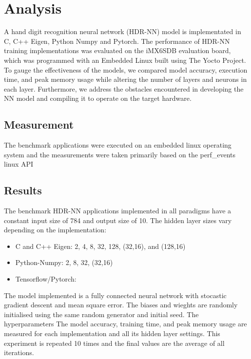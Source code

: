 \part{Analysis}
A hand digit recognition neural network (HDR-NN) model is implementated in C, C++ Eigen, Python Numpy and Pytorch. The performance of HDR-NN training implementations was evaluated on the iMX6SDB evaluation board, which was programmed with an Embedded Linux built using The Yocto Project. To gauge the effectiveness of the models, we compared model accuracy, execution time, and peak memory usage while altering the number of layers and neurons in each layer. Furthermore, we address the obstacles encountered in developing the NN model and compiling it to operate on the target hardware. 


\chapter{Measurement}

The benchmark applications were executed on an embedded linux operating system and the measurements were taken primarily based on the perf\_events linux API

\chapter{Results}
The benchmark HDR-NN applications implemented in all paradigms have a constant input size of 784 and output size of 10. The hidden layer sizes vary depending on the implementation:
\begin{itemize}
	\item C and C++ Eigen: 2, 4, 8, 32, 128, (32,16), and (128,16)
	\item Python-Numpy: 2, 8, 32, (32,16)
	\item Tensorflow/Pytorch:
\end{itemize}
The model implemented is a fully connected neural network with stocastic gradient descent and mean square error. The biases and wieghts are randomly initialised using the same random generator and initial seed. The hyperparameters   
The model accuracy, training time, and peak memory usage are measured for each implementation and all its hidden layer settings. This experiment is repeated 10 times and the final values are the average of all iterations.

